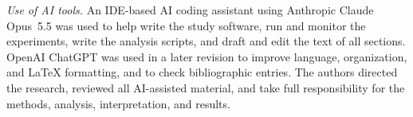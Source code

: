 \documentclass[conference]{IEEEtran}
\begin{document}
\textit{Use of AI tools.} An IDE-based AI coding assistant using Anthropic Claude Opus~5.5 was used to help write the study software, run and monitor the experiments, write the analysis scripts, and draft and edit the text of all sections. OpenAI ChatGPT was used in a later revision to improve language, organization, and LaTeX formatting, and to check bibliographic entries. The authors directed the research, reviewed all AI-assisted material, and take full responsibility for the methods, analysis, interpretation, and results.



\end{document}
